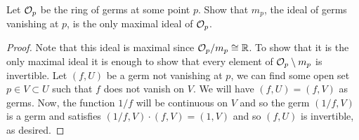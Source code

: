 
\begin{exercise}
    Let $\mathcal{O}_p$ be the ring of germs at some point $p$. Show that $m_p$, the ideal of germs vanishing at $p$, is the only maximal ideal of $\mathcal{O}_p$.
\end{exercise}

\begin{proof}
    Note that this ideal is maximal since $\mathcal{O}_p/m_p \cong \mathbb{R}$. To show that it is the only maximal ideal it is enough to show that every element of $\mathcal{O}_p \setminus m_p$ is invertible. Let $(f, U)$ be a germ not vanishing at $p$, we can find some open set $p \in V \subset U$ such that $f$ does not vanish on $V$. We will have $(f,U) = (f, V)$ as germs. Now, the function $1/f$ will be continuous on $V$ and so the germ $(1/f, V)$ is a germ and satisfies $(1/f, V) \cdot (f, V) = (1,V)$ and so $(f, U)$ is invertible, as desired.  
\end{proof}


